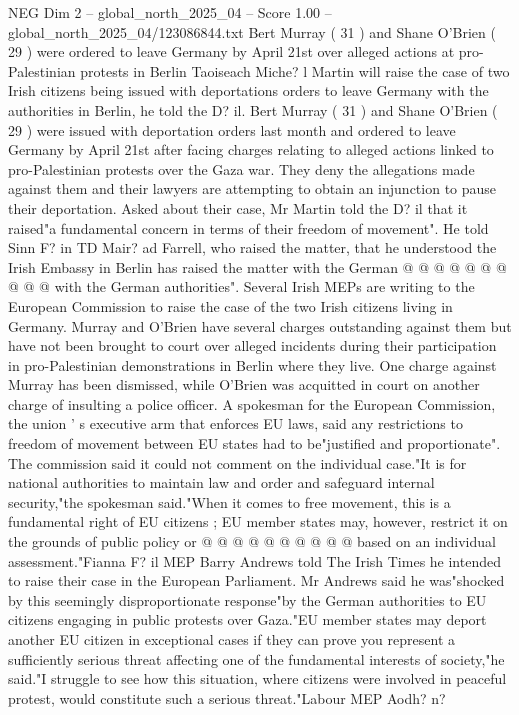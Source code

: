 \begin{textsample}{NEG Dim 2 – global\_north\_2025\_04 – Score 1.00 – global\_north\_2025\_04/123086844.txt}  \label{ex:f2_neg_017}
Bert Murray ( 31 ) and Shane O'Brien ( 29 ) were ordered to leave Germany by April 21st over alleged actions at pro-Palestinian protests in Berlin Taoiseach Miche? l Martin will raise the case of two Irish citizens being issued with deportations orders to leave Germany with the authorities in Berlin, he told the D? il.
Bert Murray ( 31 ) and Shane O'Brien ( 29 ) were issued with deportation orders last month and ordered to leave Germany by April 21st after facing charges relating to alleged actions linked to pro-Palestinian protests over the Gaza war.
They deny the allegations made against them and their lawyers are attempting to obtain an injunction to pause their deportation.
Asked about their case, Mr Martin told the D? il that it raised"a fundamental concern in terms of their freedom of movement".
He told Sinn F? in TD Mair? ad Farrell, who raised the matter, that he understood the Irish Embassy in Berlin has raised the matter with the German @ @ @ @ @ @ @ @ @ @ with the German authorities".
Several Irish MEPs are writing to the European Commission to raise the case of the two Irish citizens living in Germany.
Murray and O'Brien have several charges outstanding against them but have not been brought to court over alleged incidents during their participation in pro-Palestinian demonstrations in Berlin where they live.
One charge against Murray has been dismissed, while O'Brien was acquitted in court on another charge of insulting a police officer.
A spokesman for the European Commission, the union ' s executive arm that enforces EU laws, said any restrictions to freedom of movement between EU states had to be"justified and proportionate".
The commission said it could not comment on the individual case."It is for national authorities to maintain law and order and safeguard internal security,"the spokesman said."When it comes to free movement, this is a fundamental right of EU citizens ; EU member states may, however, restrict it on the grounds of public policy or @ @ @ @ @ @ @ @ @ @ based on an individual assessment."Fianna F? il MEP Barry Andrews told The Irish Times he intended to raise their case in the European Parliament.
Mr Andrews said he was"shocked by this seemingly disproportionate response"by the German authorities to EU citizens engaging in public protests over Gaza."EU member states may deport another EU citizen in exceptional cases if they can prove you represent a sufficiently serious threat affecting one of the fundamental interests of society,"he said."I struggle to see how this situation, where citizens were involved in peaceful protest, would constitute such a serious threat."Labour MEP Aodh? n?

\end{textsample}
